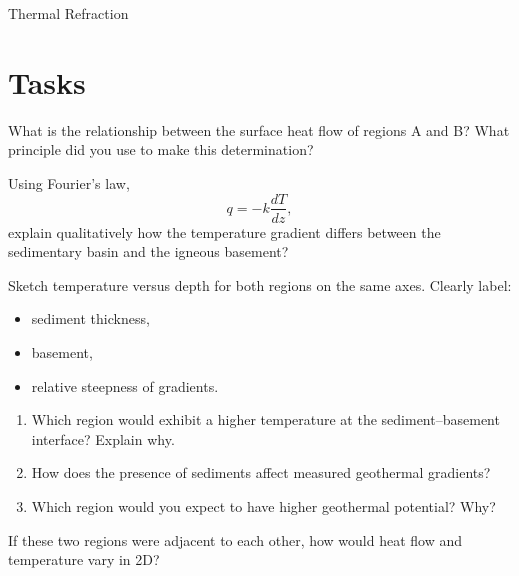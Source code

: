 \begin{activity}[Warm-up]{Thermal Refraction}
\section*{Tasks}
\begin{questions}
  What is the relationship between the surface heat flow of regions A and B?  What principle did you use to make this determination?
  \answerbox[2cm]

  Using Fourier's law,
  \[
    q = -k \frac{dT}{dz},
  \]
  explain qualitatively how the temperature gradient differs between the sedimentary basin and the igneous basement?
  \answerbox[3cm]

  Sketch temperature versus depth for both regions on the same axes.  Clearly label:
  \begin{itemize}
    \item sediment thickness,
    \item basement,
    \item relative steepness of gradients.
  \end{itemize}

  \begin{center}
  \end{center}


  \begin{enumerate}[label=\roman*]
    \item Which region would exhibit a higher temperature at the sediment--basement interface? Explain why.
    \answerbox[3cm]

    \item How does the presence of sediments affect measured geothermal gradients?
    \answerbox[2cm]

    \item Which region would you expect to have higher geothermal potential? Why?
    \answerbox[2cm]
  \end{enumerate}

  If these two regions were adjacent to each other, how would heat flow and temperature vary in 2D?


\end{questions}
\end{activity}
